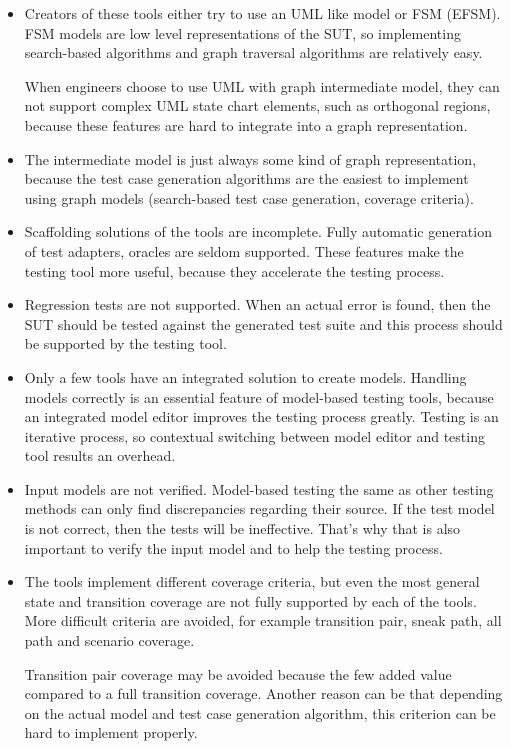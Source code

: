 \begin{itemize}
	\item Creators of these tools either try to use an UML like model or FSM (EFSM). FSM models are low level representations of the SUT, so implementing search-based algorithms and graph traversal algorithms are relatively easy.
	
	When engineers choose to use UML with graph intermediate model, they can not support complex UML state chart elements, such as orthogonal regions, because these features are hard to integrate into a graph representation.
	\item The intermediate model is just always some kind of graph representation, because the test case generation algorithms are the easiest to implement using graph models (search-based test case generation, coverage criteria).
	\item Scaffolding solutions of the tools are incomplete. Fully automatic generation of test adapters, oracles are seldom supported. These features make the testing tool more useful, because they accelerate the testing process.
	\item Regression tests are not supported. When an actual error is found, then the SUT should be tested against the generated test suite and this process should be supported by the testing tool.
	\item Only a few tools have an integrated solution to create models. Handling models correctly is an essential feature of model-based testing tools, because an integrated model editor improves the testing process greatly. Testing is an iterative process, so contextual switching between model editor and testing tool results an overhead.
	\item Input models are not verified. Model-based testing the same as other testing methods can only find discrepancies regarding their source. If the test model is not correct, then the tests will be ineffective. That's why that is also important to verify the input model and to help the testing process.
	\item The tools implement different coverage criteria, but even the most general state and transition coverage are not fully supported by each of the tools. More difficult criteria are avoided, for example transition pair, sneak path, all path and scenario coverage.
	
	Transition pair coverage may be avoided because the few added value compared to a full transition coverage. Another reason can be that depending on the actual model and test case generation algorithm, this criterion can be hard to implement properly.
	

\end{itemize}

